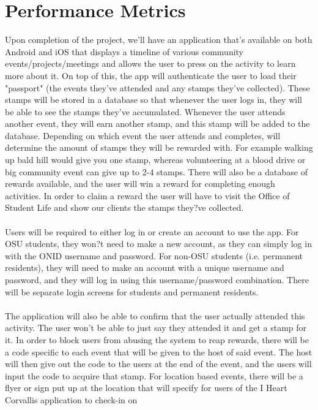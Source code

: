 \documentclass[draftclsnofoot, onecolumn, 10pt, compsoc]{IEEEtran}
\begin{document}
	\section{Performance Metrics}
		Upon completion of the project, we'll have an application that's available on both Android and iOS that displays a 
		timeline of various community events/projects/meetings and allows the user to press on the activity to learn more 
		about it. On top of this, the app will authenticate the user to load their "passport" (the events they've attended and any 
		stamps they've collected). These stamps will be stored in a database so that whenever the user logs in, they will be 
		able to see the stamps they've accumulated. Whenever the user attends another event, they will earn another stamp, 
		and this stamp will be added to the database. Depending on which event the user attends and completes, will 
		determine the amount of stamps they will be rewarded with. For example walking up bald hill would give you one 
		stamp, whereas volunteering at a blood drive or big community event can give up to 2-4 stamps. There will also be a 
		database of rewards available, and the user will win a reward for completing enough activities. In order to claim a 
		reward the user will have to visit the Office of Student Life and show our clients the stamps they?ve collected. \\ \\
		Users will be required to either log in or create an account to use the app. For OSU students, they won?t need to make 
		a new account, as they can simply log in with the ONID username and password. For non-OSU students (i.e. 
		permanent residents), they will need to make an account with a unique username and password, and they will log in 
		using this username/password combination. There will be separate login screens for students and permanent 
		residents. \\ \\
		The application will also be able to confirm that the user actually attended this activity. The user won't be able to just 
		say they attended it and get a stamp for it. In order to block users from abusing the system to reap rewards, there will 
		be a code specific to each event that will be given to the host of said event. The host will then give out the code to the 
		users at the end of the event, and the users will input the code to acquire that stamp. For location based events, there 
		will be a flyer or sign put up at the location that will specify for users of the I Heart Corvallis application to check-in on 
\end{document}
